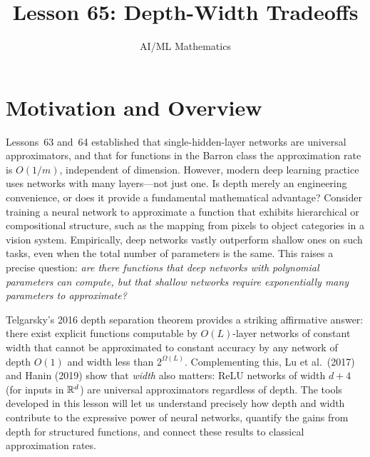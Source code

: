 \documentclass[11pt,a4paper]{article}
\title{Lesson 65: Depth-Width Tradeoffs}
\author{AI/ML Mathematics}
\date{}
\begin{document}
\maketitle
\tableofcontents
\newpage

\section{Motivation and Overview}
\label{sec:motivation}

Lessons~63 and~64 established that single-hidden-layer networks are
universal approximators, and that for functions in the Barron class the
approximation rate is $O(1/m)$, independent of dimension.  However,
modern deep learning practice uses networks with many layers---not just
one.  Is depth merely an engineering convenience, or does it provide a
fundamental mathematical advantage?  Consider training a neural network
to approximate a function that exhibits hierarchical or compositional
structure, such as the mapping from pixels to object categories in a
vision system.  Empirically, deep networks vastly outperform shallow
ones on such tasks, even when the total number of parameters is the
same.  This raises a precise question: \emph{are there functions that
deep networks with polynomial parameters can compute, but that shallow
networks require exponentially many parameters to approximate?}

Telgarsky's 2016 depth separation theorem provides a striking
affirmative answer: there exist explicit functions computable by
$O(L)$-layer networks of constant width that cannot be approximated to
constant accuracy by any network of depth $O(1)$ and width less than
$2^{\Omega(L)}$.  Complementing this, Lu et al.\ (2017) and Hanin
(2019) show that \emph{width} also matters: ReLU networks of width
$d+4$ (for inputs in $\mathbb{R}^d$) are universal approximators regardless of
depth.  The tools developed in this lesson will let us understand
precisely how depth and width contribute to the expressive power of
neural networks, quantify the gains from depth for structured functions,
and connect these results to classical approximation rates.
\end{document}
